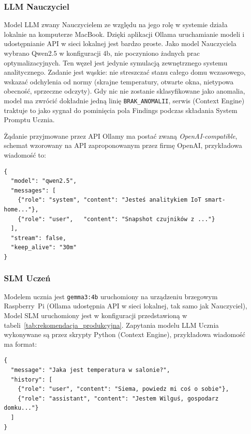 \subsubsection{LLM Nauczyciel}

Model LLM zwany Nauczycielem ze względu na jego rolę w systemie działa lokalnie na komputerze MacBook. Dzięki aplikacji Ollama uruchamianie modeli i udostępnianie API w sieci lokalnej jest bardzo proste.
Jako model Nauczyciela wybrano Qwen2.5 w konfiguracji 4b, nie poczyniono żadnych prac optymalizacyjnych. Ten węzeł jest jedynie symulacją zewnętrznego systemu analitycznego. Zadanie jest wąskie:
nie streszczać stanu całego domu wczasowego, wskazać odchylenia od normy (skrajne temperatury,
otwarte okna, nietypowa obecność, sprzeczne odczyty).
Gdy nic nie zostanie sklasyfikowane jako anomalia, model ma zwrócić dokładnie jedną linię
\texttt{BRAK\_ANOMALII}, serwis (Context Engine) traktuje to jako sygnał do pominięcia pola Findings podczas składania System Promptu Ucznia.

Żądanie przyjmowane przez API Ollamy ma postać zwaną \emph{OpenAI-compatible}, schemat wzorowany na API zaproponowanym przez firmę OpenAI, przykładowa wiadomość to:

\begin{verbatim}
{
  "model": "qwen2.5",
  "messages": [
    {"role": "system", "content": "Jesteś analitykiem IoT smart-home..."},
    {"role": "user",   "content": "Snapshot czujników z ..."}
  ],
  "stream": false,
  "keep_alive": "30m"
}
\end{verbatim}

\subsubsection{SLM Uczeń}

Modelem ucznia jest \texttt{gemma3:4b} uruchomiony na urządzeniu brzegowym Raspberry~Pi (Ollama udostępnia API w sieci lokalnej, tak samo jak Nauczyciel),
Model SLM uruchomiony jest w konfiguracji przedstawioną w tabeli~\ref{tab:rekomendacja_produkcyjna}. Zapytania modelu LLM Ucznia wykonywane są przez skrypty Python (Context Engine), przykładowa wiadomość ma format:

\begin{verbatim}
{
  "message": "Jaka jest temperatura w salonie?",
  "history": [
    {"role": "user", "content": "Siema, powiedz mi coś o sobie"},
    {"role": "assistant", "content": "Jestem Wilguś, gospodarz domku..."}
  ]
}
\end{verbatim}

